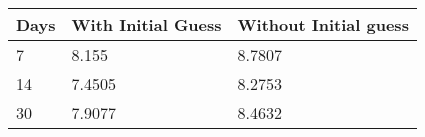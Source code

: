 \begin{tabular}{lll}
Days & With Initial Guess & Without Initial guess \\ 
\hline 
7 & 8.155 & 8.7807 \\ 
14 & 7.4505 & 8.2753 \\ 
30 & 7.9077 & 8.4632 \\ 
\hline 
\end{tabular}